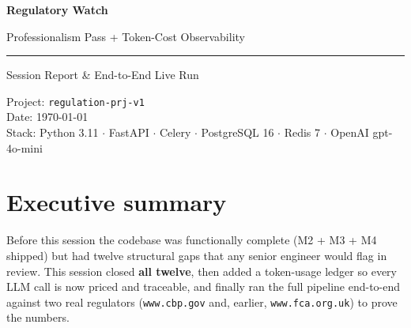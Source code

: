 \documentclass[11pt,a4paper]{article}
\begin{document}
\begin{titlepage}
\centering
\vspace*{2cm}
{\LARGE\bfseries Regulatory Watch\par}
\vspace{0.3cm}
{\Large Professionalism Pass + Token-Cost Observability\par}
\vspace{0.2cm}
\rule{0.6\linewidth}{0.4pt}\par
\vspace{0.4cm}
{\large Session Report \& End-to-End Live Run\par}
\vspace{1.5cm}


\vfill
{\small
Project: \texttt{regulation-prj-v1} \\
Date: \today \\
Stack: Python 3.11 $\cdot$ FastAPI $\cdot$ Celery $\cdot$ PostgreSQL 16 $\cdot$ Redis 7 $\cdot$ OpenAI gpt-4o-mini \\
}
\end{titlepage}

\section{Executive summary}

Before this session the codebase was functionally complete (M2 + M3 + M4
shipped) but had twelve structural gaps that any senior engineer would
flag in review. This session closed \textbf{all twelve}, then added a
token-usage ledger so every LLM call is now priced and traceable, and
finally ran the full pipeline end-to-end against two real regulators
(\texttt{www.cbp.gov} and, earlier, \texttt{www.fca.org.uk}) to prove
the numbers.
\end{document}
